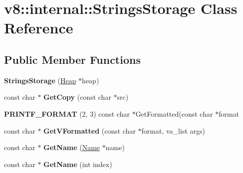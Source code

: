 \hypertarget{classv8_1_1internal_1_1_strings_storage}{}\section{v8\+:\+:internal\+:\+:Strings\+Storage Class Reference}
\label{classv8_1_1internal_1_1_strings_storage}
\subsection*{Public Member Functions}
\begin{DoxyCompactItemize}
\item 
{\bfseries Strings\+Storage} (\hyperlink{classv8_1_1internal_1_1_heap}{Heap} $\ast$heap)\hypertarget{classv8_1_1internal_1_1_strings_storage_a1254485b8e8a9c6dfea6d5512124ab63}{}\label{classv8_1_1internal_1_1_strings_storage_a1254485b8e8a9c6dfea6d5512124ab63}

\item 
const char $\ast$ {\bfseries Get\+Copy} (const char $\ast$src)\hypertarget{classv8_1_1internal_1_1_strings_storage_aa01abe028db7c4dac78ea7ec256732b9}{}\label{classv8_1_1internal_1_1_strings_storage_aa01abe028db7c4dac78ea7ec256732b9}

\item 
{\bfseries P\+R\+I\+N\+T\+F\+\_\+\+F\+O\+R\+M\+AT} (2, 3) const char $\ast$Get\+Formatted(const char $\ast$format\hypertarget{classv8_1_1internal_1_1_strings_storage_ae271742bdf0ff845520817fb03191c21}{}\label{classv8_1_1internal_1_1_strings_storage_ae271742bdf0ff845520817fb03191c21}

\item 
const char $\ast$ {\bfseries Get\+V\+Formatted} (const char $\ast$format, va\+\_\+list args)\hypertarget{classv8_1_1internal_1_1_strings_storage_aacca5d5f78b74e6c85f767270a9e0027}{}\label{classv8_1_1internal_1_1_strings_storage_aacca5d5f78b74e6c85f767270a9e0027}

\item 
const char $\ast$ {\bfseries Get\+Name} (\hyperlink{classv8_1_1internal_1_1_name}{Name} $\ast$name)\hypertarget{classv8_1_1internal_1_1_strings_storage_a684df9cbe8d91d5bf27ce2ddce36f2d5}{}\label{classv8_1_1internal_1_1_strings_storage_a684df9cbe8d91d5bf27ce2ddce36f2d5}

\item 
const char $\ast$ {\bfseries Get\+Name} (int index)\hypertarget{classv8_1_1internal_1_1_strings_storage_ab4380a43d25941062646c82ec9854018}{}\label{classv8_1_1internal_1_1_strings_storage_ab4380a43d25941062646c82ec9854018}


\end{DoxyCompactItemize}
